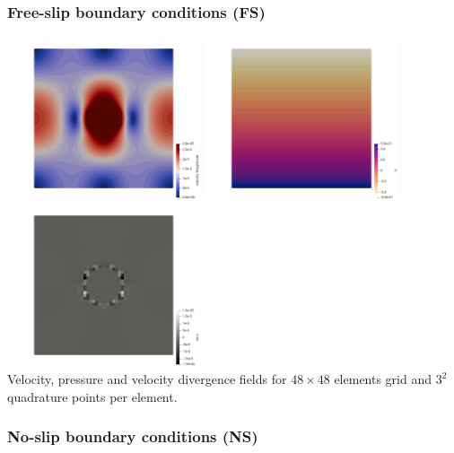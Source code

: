 \subsubsection*{Free-slip boundary conditions (FS)}

\begin{center}
\includegraphics[width=5.7cm]{python_codes/fieldstone_18/results/sphere/FS/vel}
\includegraphics[width=5.7cm]{python_codes/fieldstone_18/results/sphere/FS/press}
\includegraphics[width=5.7cm]{python_codes/fieldstone_18/results/sphere/FS/divv}\\
{\captionfont Velocity, pressure and velocity divergence fields for $48\times 48$ 
elements grid and $3^2$ quadrature points per element.}
\end{center}






\subsubsection*{No-slip boundary conditions (NS)}

